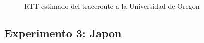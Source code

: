 \begin{figure}[H]
  \centering
  \caption{RTT estimado del traceroute a la Universidad de Oregon }
  \label{eeuuTTL}
\end{figure}


\newpage
\subsection{Experimento 3: Japon}

\begin{landscape}
  
\end{landscape}

